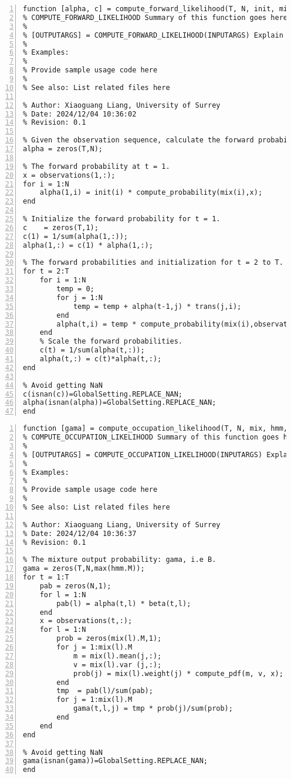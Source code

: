 \documentclass{article}
\begin{document}
\begin{lstlisting}[frame=single, numbers=left, style=Matlab-editor, caption={compute\_forward\_likelihood.m}, label={lst:compute_forward_likelihood}]
  function [alpha, c] = compute_forward_likelihood(T, N, init, mix, trans, observations)
% COMPUTE_FORWARD_LIKELIHOOD Summary of this function goes here
% 
% [OUTPUTARGS] = COMPUTE_FORWARD_LIKELIHOOD(INPUTARGS) Explain usage here
% 
% Examples: 
% 
% Provide sample usage code here
% 
% See also: List related files here

% Author: Xiaoguang Liang, University of Surrey 
% Date: 2024/12/04 10:36:02 
% Revision: 0.1 

% Given the observation sequence, calculate the forward probability.
alpha = zeros(T,N);

% The forward probability at t = 1.
x = observations(1,:);
for i = 1:N
    alpha(1,i) = init(i) * compute_probability(mix(i),x);
end

% Initialize the forward probability for t = 1.
c    = zeros(T,1);
c(1) = 1/sum(alpha(1,:));
alpha(1,:) = c(1) * alpha(1,:);

% The forward probabilities and initialization for t = 2 to T.
for t = 2:T
    for i = 1:N
        temp = 0;
        for j = 1:N
            temp = temp + alpha(t-1,j) * trans(j,i);
        end
        alpha(t,i) = temp * compute_probability(mix(i),observations(t,:));
    end
    % Scale the forward probabilities.
    c(t) = 1/sum(alpha(t,:));
    alpha(t,:) = c(t)*alpha(t,:);
end

% Avoid getting NaN
c(isnan(c))=GlobalSetting.REPLACE_NAN;
alpha(isnan(alpha))=GlobalSetting.REPLACE_NAN;
end

\end{lstlisting}

\begin{lstlisting}[frame=single, numbers=left, style=Matlab-editor, caption={compute\_occupation\_likelihood.m}, label={lst:compute_occupation_likelihood}]
  function [gama] = compute_occupation_likelihood(T, N, mix, hmm, observations, alpha, beta)
% COMPUTE_OCCUPATION_LIKELIHOOD Summary of this function goes here
% 
% [OUTPUTARGS] = COMPUTE_OCCUPATION_LIKELIHOOD(INPUTARGS) Explain usage here
% 
% Examples: 
% 
% Provide sample usage code here
% 
% See also: List related files here

% Author: Xiaoguang Liang, University of Surrey 
% Date: 2024/12/04 10:36:37 
% Revision: 0.1 

% The mixture output probability: gama, i.e B.
gama = zeros(T,N,max(hmm.M));
for t = 1:T
    pab = zeros(N,1);
    for l = 1:N
        pab(l) = alpha(t,l) * beta(t,l);
    end
    x = observations(t,:);
    for l = 1:N
        prob = zeros(mix(l).M,1);
        for j = 1:mix(l).M
            m = mix(l).mean(j,:);
            v = mix(l).var (j,:);
            prob(j) = mix(l).weight(j) * compute_pdf(m, v, x);
        end
        tmp  = pab(l)/sum(pab);
        for j = 1:mix(l).M
            gama(t,l,j) = tmp * prob(j)/sum(prob);
        end
    end
end

% Avoid getting NaN
gama(isnan(gama))=GlobalSetting.REPLACE_NAN;
end

\end{lstlisting}
\end{document}

